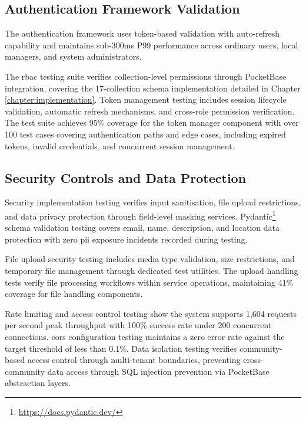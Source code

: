 \subsection{Authentication Framework Validation} \label{subsection:authentication_validation}

The authentication framework uses token-based validation with auto-refresh capability and maintains sub-300ms P99 performance across ordinary users, local managers, and system administrators.

The \ac{rbac} testing suite verifies collection-level permissions through PocketBase integration, covering the 17-collection schema implementation detailed in Chapter \ref{chapter:implementation}. Token management testing includes session lifecycle validation, automatic refresh mechanisms, and cross-role permission verification. The test suite achieves 95\% coverage for the token manager component with over 100 test cases covering authentication paths and edge cases, including expired tokens, invalid credentials, and concurrent session management.

\subsection{Security Controls and Data Protection} \label{subsection:security_controls}

Security implementation testing verifies input sanitisation, file upload restrictions, and data privacy protection through field-level masking services. Pydantic\footnote{\url{https://docs.pydantic.dev/}} schema validation testing covers email, name, description, and location data protection with zero \ac{pii} exposure incidents recorded during testing.

File upload security testing includes media type validation, size restrictions, and temporary file management through dedicated test utilities. The upload handling tests verify file processing workflows within service operations, maintaining 41\% coverage for file handling components.

Rate limiting and access control testing show the system supports 1,604 requests per second peak throughput with 100\% success rate under 200 concurrent connections. \ac{cors} configuration testing maintains a zero error rate against the target threshold of less than 0.1\%. Data isolation testing verifies community-based access control through multi-tenant boundaries, preventing cross-community data access through SQL injection prevention via PocketBase abstraction layers.

